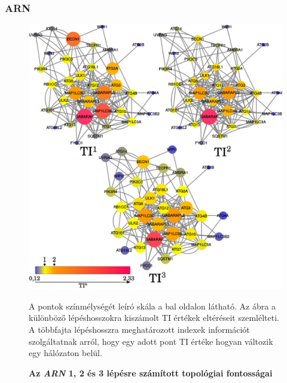 \documentclass[a4paper,12pt]{article}
\newenvironment{imgdesc}{
		\small
		\singlespacing
		\begin{center}
		
	}{
		\end{center}	
	}
\begin{document}
		\subsubsection{ARN}
	
				\begin{figure}[H]
					\includegraphics[scale=0.48]{img/arn_123_comp.pdf}
					\centering
					\caption{ \textbf{Az \textit{ARN} 1, 2 és 3 lépésre számított topológiai fontosságai}}
					\begin{imgdesc}
						A pontok színmélységét leíró skála a bal oldalon látható. Az ábra a különböző lépéshosszokra kiszámolt TI értékek eltéréseit szemlélteti. A többfajta lépéshosszra meghatározott indexek információt szolgáltatnak arról, hogy egy adott pont TI értéke hogyan változik egy hálózaton belül.
					\end{imgdesc}
		
					\label{fig:arn123}			 		 
				\end{figure}
				
\end{document}
